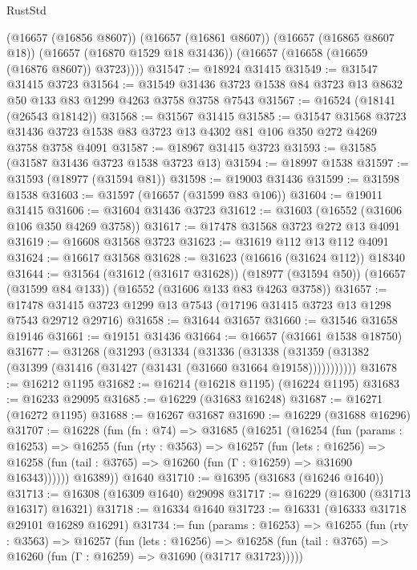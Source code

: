 \begin{lexlean}{RustStd}
\begin{coremodule}
        (@16657 (@16856 @8607))
        (@16657 (@16861 @8607))
        (@16657 (@16865 @8607 @18))
        (@16657 (@16870 @1529 @18 @31436))
        (@16657 (@16658 (@16659 (@16876 @8607)) @3723))))
@31547 := @18924 @31415
@31549 := @31547 @31415 @3723
@31564 := @31549 @31436 @3723 @1538 @84 @3723 @13 @8632 @50 @133 @83 @1299 @4263 @3758 @3758 @7543
@31567 := @16524 (@18141 (@26543 @18142))
@31568 := @31567 @31415
@31585 := @31547
    @31568
    @3723
    @31436
    @3723
    @1538
    @83
    @3723
    @13
    @4302
    @81
    @106
    @350
    @272
    @4269
    @3758
    @3758
    @4091
@31587 := @18967 @31415 @3723
@31593 := @31585 (@31587 @31436 @3723 @1538 @3723 @13)
@31594 := @18997 @1538
@31597 := @31593 (@18977 (@31594 @81))
@31598 := @19003 @31436
@31599 := @31598 @1538
@31603 := @31597 (@16657 (@31599 @83 @106))
@31604 := @19011 @31415
@31606 := @31604 @31436 @3723
@31612 := @31603 (@16552 (@31606 @106 @350 @4269 @3758))
@31617 := @17478 @31568 @3723 @272 @13 @4091
@31619 := @16608 @31568 @3723
@31623 := @31619 @112 @13 @112 @4091
@31624 := @16617 @31568
@31628 := @31623 (@16616 (@31624 @112)) @18340
@31644 := @31564
    (@31612 (@31617 @31628))
    (@18977 (@31594 @50))
    (@16657 (@31599 @84 @133))
    (@16552 (@31606 @133 @83 @4263 @3758))
@31657 := @17478 @31415 @3723 @1299 @13 @7543 (@17196 @31415 @3723 @13 @1298 @7543 @29712 @29716)
@31658 := @31644 @31657
@31660 := @31546 @31658 @19146
@31661 := @19151 @31436
@31664 := @16657 (@31661 @1538 @18750)
@31677 := @31268
    (@31293
      (@31334
        (@31336
          (@31338 (@31359 (@31382 (@31399 (@31416 (@31427 (@31431 (@31660 @31664 @19158)))))))))))
@31678 := @16212 @1195
@31682 := @16214 (@16218 @1195) (@16224 @1195)
@31683 := @16233 @29095
@31685 := @16229 (@31683 @16248)
@31687 := @16271 (@16272 @1195)
@31688 := @16267 @31687
@31690 := @16229 (@31688 @16296)
@31707 := @16228
    (fun (fn : @74) =>
    @31685
      (@16251
        (@16254
          (fun (params : @16253) =>
          @16255
            (fun (rty : @3563) =>
            @16257
              (fun (lets : @16256) =>
              @16258 (fun (tail : @3765) => @16260 (fun (Γ : @16259) => @31690 @16343))))))
        @16389))
    @1640
@31710 := @16395 (@31683 (@16246 @1640))
@31713 := @16308 (@16309 @1640) @29098
@31717 := @16229 (@16300 (@31713 @16317) @16321)
@31718 := @16334 @1640
@31723 := @16331 (@16333 @31718 @29101 @16289 @16291)
@31734 := fun (params : @16253) =>
  @16255
    (fun (rty : @3563) =>
    @16257
      (fun (lets : @16256) =>
      @16258 (fun (tail : @3765) => @16260 (fun (Γ : @16259) => @31690 (@31717 @31723)))))

\end{coremodule}
\end{lexlean}
